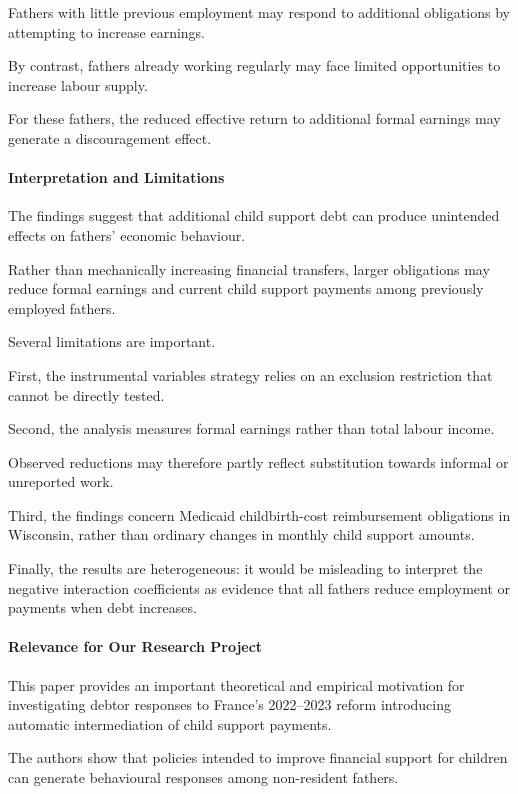 \documentclass{article}
\begin{document}
Fathers with little previous
employment may respond to
additional obligations by
attempting to increase earnings.

By contrast, fathers already
working regularly may face
limited opportunities to
increase labour supply.

For these fathers, the reduced
effective return to additional
formal earnings may generate
a discouragement effect.

\paragraph{Interpretation and Limitations}

The findings suggest that
additional child support debt
can produce unintended effects
on fathers' economic behaviour.

Rather than mechanically
increasing financial transfers,
larger obligations may reduce
formal earnings and current
child support payments among
previously employed fathers.

Several limitations are important.

First, the instrumental variables
strategy relies on an exclusion
restriction that cannot be
directly tested.

Second, the analysis measures
formal earnings rather than
total labour income.

Observed reductions may therefore
partly reflect substitution
towards informal or unreported work.

Third, the findings concern
Medicaid childbirth-cost
reimbursement obligations
in Wisconsin, rather than
ordinary changes in monthly
child support amounts.

Finally, the results are
heterogeneous: it would be
misleading to interpret the
negative interaction coefficients
as evidence that all fathers
reduce employment or payments
when debt increases.

\paragraph{Relevance for Our Research Project}

This paper provides an important
theoretical and empirical motivation
for investigating debtor responses
to France's 2022--2023 reform
introducing automatic intermediation
of child support payments.

The authors show that policies
intended to improve financial
support for children can
generate behavioural responses
among non-resident fathers.
\end{document}
